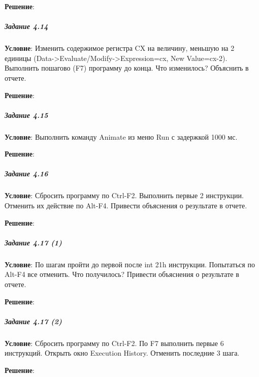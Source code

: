 \textbf{Решение}:



\subparagraph{Задание 4.14}

\textbf{Условие}:
Изменить содержимое регистра CX на величину, меньшую на 2 единицы (Data->Evaluate/Modify->Expression=cx, New Value=cx-2). Выполнить пошагово (F7) программу до конца. Что изменилось? Объяснить в отчете.

\textbf{Решение}:



\subparagraph{Задание 4.15}

\textbf{Условие}:
Выполнить команду Animate из меню Run с задержкой 1000 мс.

\textbf{Решение}:



\subparagraph{Задание 4.16}

\textbf{Условие}:
Сбросить программу по Ctrl-F2. Выполнить первые 2 инструкции. Отменить их действие по Alt-F4. Привести объяснения о результате в отчете.

\textbf{Решение}:



\subparagraph{Задание 4.17 (1)}

\textbf{Условие}:
По шагам пройти до первой после int 21h инструкции. Попытаться по Alt-F4 все отменить. Что получилось? Привести объяснения о результате в отчете.

\textbf{Решение}:



\subparagraph{Задание 4.17 (2)}

\textbf{Условие}:
Сбросить программу по Ctrl-F2. По F7 выполнить первые 6 инструкций. Открыть окно Execution History. Отменить последние 3 шага.

\textbf{Решение}:


